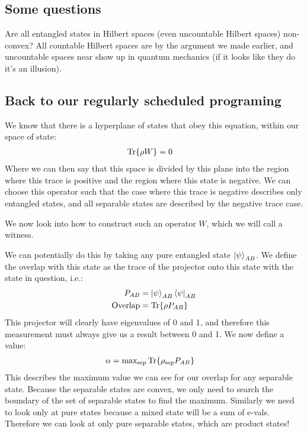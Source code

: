 \subsection*{Some questions}
Are all entangled states in Hilbert spaces (even uncountable Hilbert spaces) non-convex? All countable Hilbert spaces are by the argument we made earlier, and uncountable spaces near show up in quantum mechanics (if it looks like they do it's an illusion).

\subsection*{Back to our regularly scheduled programing}
We know that there is a hyperplane of states that obey this equation, within our space of state:
\begin{align*}
	\Tr{\rho W} &= 0
\end{align*}
Where we can then say that this space is divided by this plane into the region where this trace is positive and the region where this state is negative.
We can choose this operator such that the case where this trace is negative describes only entangled states, and all separable states are described by the negative trace case.

We now look into how to construct such an operator $W$, which we will call a witness. 

We can potentially do this by taking any pure entangled state $\ket{\psi}_{AB}$. We define the overlap with this state as the trace of the projector onto this state with the state in question, i.e.:
\begin{align*}
	P_{AB} &= \ket{\psi}_{AB}\bra{\psi}_{AB} \\
	\text{Overlap} &= \Tr{\rho P_{AB}}
\end{align*}
This projector will clearly have eigenvalues of 0 and 1, and therefore this measurement must always give us a result between 0 and 1. We now define a value:
\begin{align*}
	\alpha &= \text{max}_\text{sep} \Tr{\rho_\text{sep}P_{AB}}
\end{align*}
This describes the maximum value we can see for our overlap for any separable state. Because the separable states are convex, we only need to search the boundary of the set of separable states to find the maximum.
Similarly we need to look only at pure states because a mixed state will be a sum of e-vals. Therefore we can look at only pure separable states, which are product states!

